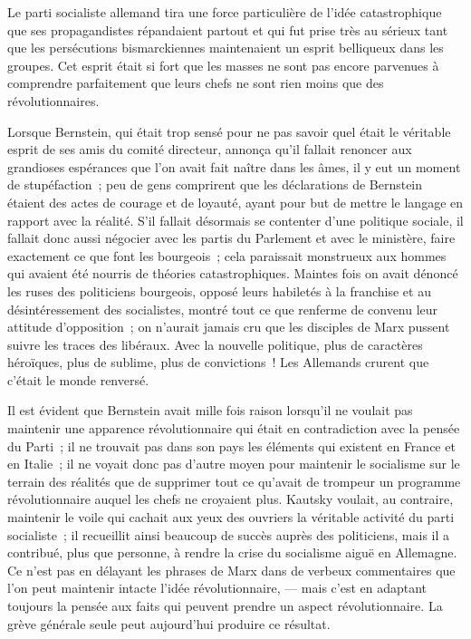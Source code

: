 \documentclass[french,twoside]{book} %
\begin{document}
Le parti socialiste allemand tira une force particulière de l’idée catastrophique que ses propagandistes répandaient partout et qui fut prise très au sérieux tant que les persécutions bismarckiennes maintenaient un esprit belliqueux dans les groupes. Cet esprit était si fort que les masses ne sont pas encore parvenues à comprendre  parfaitement que leurs chefs ne sont rien moins que des révolutionnaires.\par
Lorsque Bernstein, qui était trop sensé pour ne pas savoir quel était le véritable esprit de ses amis du comité directeur, annonça qu’il fallait renoncer aux grandioses espérances que l’on avait fait naître dans les âmes, il y eut un moment de stupéfaction ; peu de gens comprirent que les déclarations de Bernstein étaient des actes de courage et de loyauté, ayant pour but de mettre le langage en rapport avec la réalité. S’il fallait désormais se contenter d’une politique sociale, il fallait donc aussi négocier avec les partis du Parlement et avec le ministère, faire exactement ce que font les bourgeois ; cela paraissait monstrueux aux hommes qui avaient été nourris de théories catastrophiques. Maintes fois on avait dénoncé les ruses des politiciens bourgeois, opposé leurs habiletés à la franchise et au désintéressement des socialistes, montré tout ce que renferme de convenu leur attitude d’opposition ; on n’aurait jamais cru que les disciples de Marx pussent suivre les traces des libéraux. Avec la nouvelle politique, plus de caractères héroïques, plus de sublime, plus de convictions ! Les Allemands crurent que c’était le monde renversé.\par
Il est évident que Bernstein avait mille fois raison lorsqu’il ne voulait pas maintenir une apparence révolutionnaire qui était en contradiction avec la pensée du Parti ; il ne trouvait pas dans son pays les éléments qui existent en France et en Italie ; il ne voyait donc pas d’autre moyen pour maintenir le socialisme sur le terrain des réalités que de supprimer tout ce qu’avait de trompeur un programme révolutionnaire auquel les  chefs ne croyaient plus. Kautsky voulait, au contraire, maintenir le voile qui cachait aux yeux des ouvriers la véritable activité du parti socialiste ; il recueillit ainsi beaucoup de succès auprès des politiciens, mais il a contribué, plus que personne, à rendre la crise du socialisme aiguë en Allemagne. Ce n’est pas en délayant les phrases de Marx dans de verbeux commentaires que l’on peut maintenir intacte l’idée révolutionnaire, — mais c’est en adaptant toujours la pensée aux faits qui peuvent prendre un aspect révolutionnaire. La grève générale seule peut aujourd’hui produire ce résultat.\par
\end{document}
